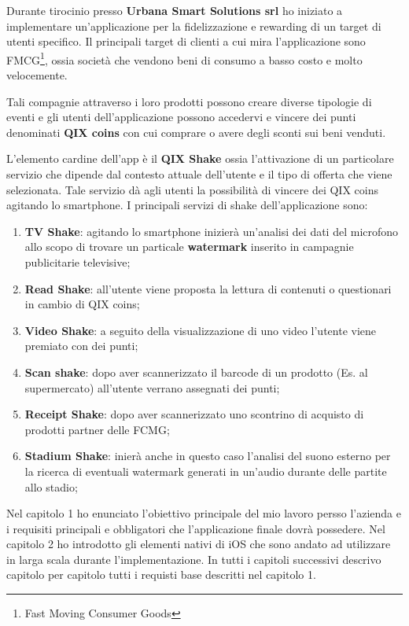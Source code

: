 \normalsize
Durante tirocinio presso \textbf{Urbana Smart Solutions srl}\cite{urbanasmartsolutions}
ho iniziato a implementare un'applicazione per la fidelizzazione e rewarding di un target di utenti specifico. 
Il principali target di clienti a cui mira l'applicazione sono FMCG\footnote{Fast Moving Consumer
Goods}, ossia società che vendono beni di consumo a basso
costo e molto velocemente.

Tali compagnie attraverso i loro prodotti possono creare diverse
tipologie di eventi e gli utenti dell’applicazione possono accedervi
e vincere dei punti denominati \textbf{QIX coins} con cui comprare o avere degli
sconti sui beni venduti.


L’elemento cardine dell’app è il \textbf{QIX Shake} ossia l’attivazione di un particolare servizio
che dipende dal contesto attuale dell'utente e il tipo di offerta che viene selezionata.
Tale servizio dà agli utenti la possibilità di vincere dei QIX coins agitando lo smartphone.
I principali servizi di shake dell'applicazione sono:

\begin{enumerate}
    \item\textbf{TV Shake}: agitando lo smartphone inizierà un'analisi dei dati del microfono
    allo scopo di trovare un particale \textbf{watermark} inserito in campagnie publicitarie televisive;
    \item\textbf{Read Shake}: all'utente viene proposta la lettura di contenuti o questionari in cambio di QIX coins;
    \item\textbf{Video Shake}: a seguito della visualizzazione di uno video l'utente viene premiato con dei punti;
    \item\textbf{Scan shake}: dopo aver scannerizzato il barcode di un prodotto (Es. al supermercato) all'utente verrano assegnati dei punti;
    \item\textbf{Receipt Shake}: dopo aver scannerizzato uno scontrino di acquisto di prodotti partner delle FCMG;
    \item\textbf{Stadium Shake}: inierà anche in questo caso l'analisi del suono esterno per la ricerca di eventuali watermark
    generati in un'audio durante delle partite allo stadio;
\end{enumerate}


Nel capitolo 1 ho enunciato l'obiettivo principale del mio lavoro persso l'azienda e
i requisiti principali e obbligatori che l'applicazione finale dovrà possedere.
Nel capitolo 2 ho introdotto gli elementi nativi di iOS che sono andato ad utilizzare in larga scala
durante l'implementazione. In tutti i capitoli successivi descrivo capitolo per capitolo tutti i requisti
base descritti nel capitolo 1.